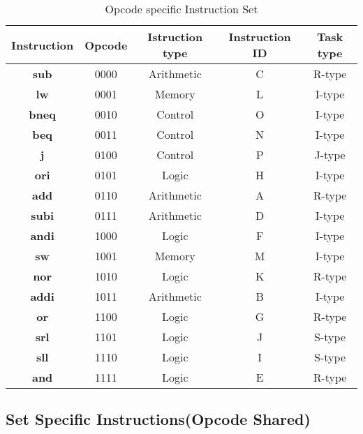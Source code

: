 \documentclass[12pt]{article}
\begin{document}
\begin{table}[H]
    \centering
    \begin{tabular}{|c|c|c|c|c|}

        \hline
        \textbf{Instruction} & \textbf{Opcode} & \textbf{Istruction type} & \textbf{Instruction ID} & \textbf{Task type} \\
        \hline
        \textbf{sub} & 0000 & Arithmetic & C & R-type\\
        \hline
        \textbf{lw} & 0001 & Memory & L & I-type\\
        \hline
        \textbf{bneq} & 0010 & Control & O & I-type\\
        \hline
        \textbf{beq} & 0011 & Control & N & I-type\\
        \hline
        
        \textbf{j} & 0100 & Control & P & J-type\\
        \hline
        \textbf{ori} & 0101 & Logic & H & I-type\\
        \hline
        \textbf{add} & 0110 & Arithmetic & A & R-type\\
        \hline
        \textbf{subi} & 0111 & Arithmetic & D & I-type\\
        \hline
        
        \textbf{andi} & 1000 & Logic & F & I-type\\
        \hline
        \textbf{sw} & 1001 & Memory & M & I-type\\
        \hline
        \textbf{nor} & 1010 & Logic & K & R-type\\
        \hline
        \textbf{addi} & 1011 & Arithmetic & B & I-type\\
        \hline
        
        \textbf{or} & 1100 & Logic & G & R-type\\
        \hline
        \textbf{srl} & 1101 & Logic & J & S-type\\
        \hline
        \textbf{sll} & 1110 & Logic & I & S-type\\
        \hline
        \textbf{and} & 1111 & Logic & E & R-type\\
        \hline
    \end{tabular}
    \caption{Opcode specific Instruction Set}
    \label{tab:t2}
\end{table}

\subsection{Set Specific Instructions(Opcode Shared)}
\end{document}
